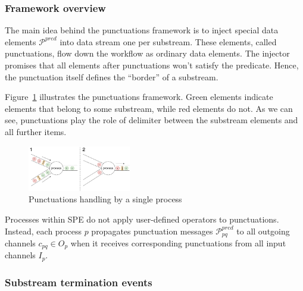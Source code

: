 \subsubsection{Framework overview}

The main idea behind the punctuations framework is to inject special data elements $\mathcal{P}^{pred}$ into data stream one per substream. These elements, called punctuations, flow down the workflow as ordinary data elements. The injector promises that all elements after punctuations won't satisfy the predicate. Hence, the punctuation itself defines the ``border'' of a substream.

Figure~\ref{punctuations_scheme} illustrates the punctuations framework. Green elements indicate elements that belong to some substream, while red elements do not. As we can see, punctuations play the role of delimiter between the substream elements and all further items.

\begin{figure}[t]
  \centering
  \includegraphics[width=0.40\textwidth]{pics/punctuations-scheme.pdf}
  \caption{Punctuations handling by a single process}
  \label{punctuations_scheme}
\end{figure}

Processes within SPE do not apply user-defined operators to punctuations. Instead, each process $p$ propagates punctuation messages $\mathcal{P}_{pq}^{pred}$ to all outgoing channels $c_{pq} \in O_p$  when it receives corresponding punctuations from all input channels $I_p$.

\subsubsection{Substream termination events}

